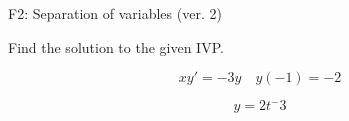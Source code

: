 \begin{exercise}
  \begin{exerciseTitle}F2: Separation of variables (ver. 2)\end{exerciseTitle}
  \begin{exerciseStatement}
    
Find the solution to the given IVP.

    
\[xy'= -3 y \hspace{1em} y( -1 ) = -2\]

  \end{exerciseStatement}
  \begin{exerciseAnswer}
    
\[y= 2 t^ -3\]

  \end{exerciseAnswer}
\end{exercise}